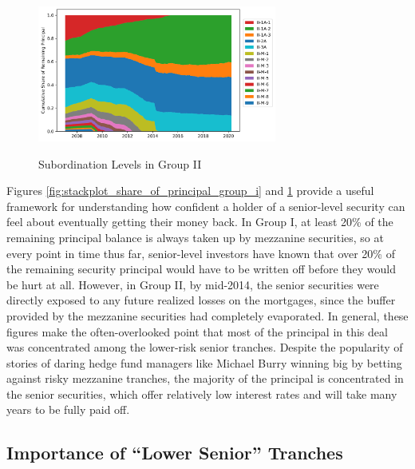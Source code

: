 \documentclass[12pt]{article}
\begin{document}
\begin{figure}[h]
	\centering
	\caption{Subordination Levels in Group II}
	\includegraphics[width=0.7\textwidth]{../figures/stackplot_share_of_principal_group_ii}
	\label{fig:stackplot_share_of_principal_group_ii}
\end{figure}

Figures \ref{fig:stackplot_share_of_principal_group_i} and \ref{fig:stackplot_share_of_principal_group_ii} provide a useful framework for understanding how confident a holder of a senior-level security can feel about eventually getting their money back. In Group I, at least 20\% of the remaining principal balance is always taken up by mezzanine securities, so at every point in time thus far, senior-level investors have known that over 20\% of the remaining security principal would have to be written off before they would be hurt at all. However, in Group II, by mid-2014, the senior securities were directly exposed to any future realized losses on the mortgages, since the buffer provided by the mezzanine securities had completely evaporated. In general, these figures make the often-overlooked point that most of the principal in this deal was concentrated among the lower-risk senior tranches. Despite the popularity of stories of daring hedge fund managers like Michael Burry winning big by betting against risky mezzanine tranches, the majority of the principal is concentrated in the senior securities, which offer relatively low interest rates and will take many years to be fully paid off.

\subsection*{Importance of ``Lower Senior'' Tranches}
\end{document}

